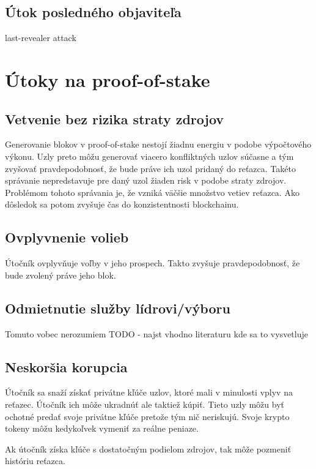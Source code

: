 \subsection{Útok posledného objaviteľa}\label{subsec:lst-re-attack}

last-revealer attack~\cite{lastRevealerAttack}

\section{Útoky na proof-of-stake}\label{sec:pos-attacks}

\subsection{Vetvenie bez rizika straty zdrojov}
Generovanie blokov v proof-of-stake nestojí žiadnu energiu v podobe výpočtového výkonu. Uzly preto môžu generovať viacero konfliktných uzlov súčasne a tým zvyšovať pravdepodobnosť, že bude práve ich uzol pridaný do reťazca. Takéto správanie nepredstavuje pre daný uzol žiaden risk v podobe straty zdrojov. Problémom tohoto správania je, že vzniká väčšie množstvo vetiev reťazca. Ako dôsledok sa potom zvyšuje čas do konzistentnosti blockchainu.

\subsection{Ovplyvnenie volieb}
Útočník ovplyvňuje voľby v jeho prospech. Takto zvyšuje pravdepodobnosť, že bude zvolený práve jeho blok. 

\subsection{Odmietnutie služby lídrovi/výboru}

Tomuto vobec nerozumiem TODO - najst vhodno literaturu kde sa to vysvetluje

\subsection{Neskoršia korupcia}
Útočník sa snaží získať privátne kľúče uzlov, ktoré mali v minulosti vplyv na reťazec. Útočník ich môže ukradnúť ale taktiež kúpiť. Tieto uzly môžu byť ochotné predať svoje privátne kľúče pretože tým nič neriskujú. Svoje krypto tokeny môžu kedykoľvek vymeniť za reálne peniaze.

Ak útočník získa kľúče s dostatočným podielom zdrojov, tak môže pozmeniť históriu reťazca. 

